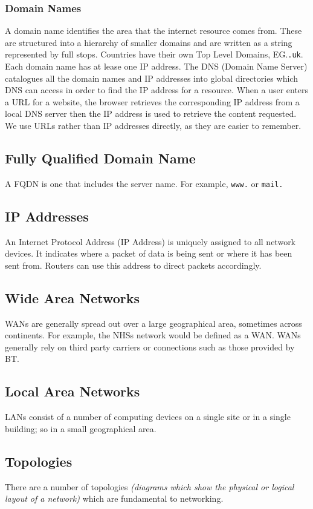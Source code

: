 \documentclass[a4paper,11pt, twocolumn]{article}
\begin{document}
\subsubsection{Domain Names}
A domain name identifies the area that the internet resource comes from. These are structured into a hierarchy of smaller domains and are written as a string represented by full stops. Countries have their own Top Level Domains, EG.\verb|.uk|.  
Each domain name has at lease one IP address. The DNS (Domain Name Server) catalogues all the domain names and IP addresses into global directories which DNS can access in order to find the IP address for a resource. When a user enters a URL for a website, the browser retrieves the corresponding IP address from a local DNS server then the IP address is used to retrieve the content requested. We use URLs rather than IP addresses directly, as they are easier to remember. 
\subsection{Fully Qualified Domain Name}
A FQDN is one that includes the server name. For example, \verb|www.| or \verb|mail.|
\subsection{IP Addresses}
An Internet Protocol Address (IP Address) is uniquely assigned to all network devices. It indicates where a packet of data is being sent or where it has been sent from. Routers can use this address to direct packets accordingly.
\subsection{Wide Area Networks}
WANs are generally spread out over a large geographical area, sometimes across continents. For example, the NHSs network would be defined as a WAN. WANs generally rely on third party carriers or connections such as those provided by BT.
\subsection{Local Area Networks}
LANs consist of a number of computing devices on a single site or in a single building; so in a small geographical area.
\subsection{Topologies}
There are a number of topologies \textit{(diagrams which show the physical or logical layout of a network)} which are fundamental to networking.
\end{document}
